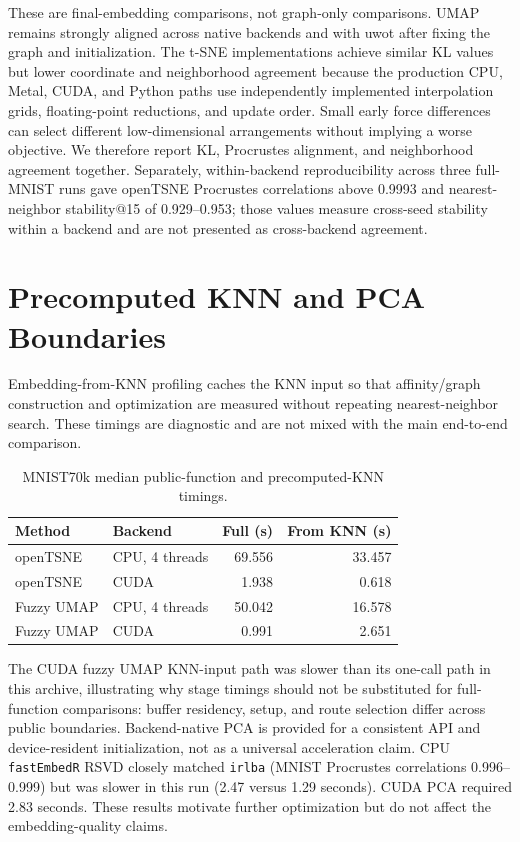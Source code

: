 \documentclass[twoside,11pt]{article}
\newcommand{\pkg}{\texttt{fastEmbedR}}
\begin{document}
\clearpage
These are final-embedding comparisons, not graph-only comparisons. UMAP
remains strongly aligned across native backends and with uwot after fixing
the graph and initialization. The t-SNE implementations achieve similar KL
values but lower coordinate and neighborhood agreement because the production
CPU, Metal, CUDA, and Python paths use independently implemented
interpolation grids, floating-point reductions, and update order. Small early
force differences can select different low-dimensional arrangements without
implying a worse objective. We therefore report KL, Procrustes alignment, and
neighborhood agreement together. Separately, within-backend reproducibility
across three full-MNIST runs gave openTSNE Procrustes correlations above
0.9993 and nearest-neighbor stability@15 of 0.929--0.953; those values measure
cross-seed stability within a backend and are not presented as cross-backend
agreement.

\section{Precomputed KNN and PCA Boundaries}

Embedding-from-KNN profiling caches the KNN input so that affinity/graph construction and optimization are measured without repeating nearest-neighbor search. These timings are diagnostic and are not mixed with the main end-to-end comparison.

\begin{table}[ht]
\centering
\caption{MNIST70k median public-function and precomputed-KNN timings.}
\label{tab:backend}
\small
\begin{tabular}{llrr}
\toprule
Method & Backend & Full (s) & From KNN (s)\\
\midrule
openTSNE & CPU, 4 threads & 69.556 & 33.457\\
openTSNE & CUDA & 1.938 & 0.618\\
Fuzzy UMAP & CPU, 4 threads & 50.042 & 16.578\\
Fuzzy UMAP & CUDA & 0.991 & 2.651\\
\bottomrule
\end{tabular}
\end{table}

The CUDA fuzzy UMAP KNN-input path was slower than its one-call path in this archive, illustrating why stage timings should not be substituted for full-function comparisons: buffer residency, setup, and route selection differ across public boundaries. Backend-native PCA is provided for a consistent API and device-resident initialization, not as a universal acceleration claim. CPU \pkg{} RSVD closely matched \texttt{irlba} (MNIST Procrustes correlations 0.996--0.999) but was slower in this run (2.47 versus 1.29 seconds). CUDA PCA required 2.83 seconds. These results motivate further optimization but do not affect the embedding-quality claims.
\end{document}
